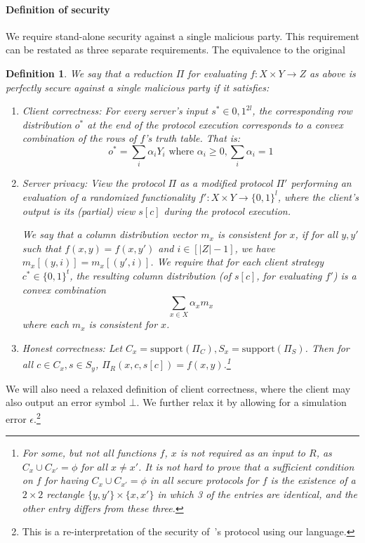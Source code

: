 \documentclass[a4paper]{article}
\newtheorem{definition}{Definition}[section]
\newcommand{\support}{\mathrm{support}}
\begin{document}
\paragraph{Definition of security}
We require stand-alone security against a single malicious party. This requirement can be restated as three separate requirements. The equivalence to the original 
\begin{definition}\label{perfect-security}
We say that a reduction $\Pi$ for evaluating $f:X\times Y\rightarrow Z$ as above is perfectly secure against a single malicious party if it satisfies:
\begin{enumerate}
\item Client correctness: For every server's input $s^*\in {0,1}^{2l}$, the corresponding row distribution $o^*$ at the end
of the protocol execution corresponds to a convex combination of the rows of $f$'s truth table. That is:
\[o^* = \sum_i \alpha_iY_i\text{ where } \alpha_i\geq 0,\sum_i\alpha_i=1\]
\item Server privacy: View the protocol $\Pi$ as a modified protocol $\Pi'$ performing an evaluation of a randomized functionality $f':X\times Y\rightarrow\{0,1\}^l$, where the client's output is its (partial) view $s[c]$ during the protocol execution. 

We say that a column distribution vector $m_x$ is consistent for $x$, if for all $y,y'$ such that $f(x,y)= f(x,y')$ and $i\in [|Z|-1]$, we have $m_x[(y,i)]=m_x[(y',i)]$. 
We require that for each client strategy $c^*\in\{0,1\}^t$, 
the resulting column distribution (of $s[c]$, for evaluating $f'$) is a convex combination
\[\sum_{x\in X} \alpha_xm_x\] where each $m_x$ is consistent for $x$.

\item Honest correctness: Let $C_x=\support(\Pi_C),S_x=\support(\Pi_S)$. Then for all $c\in C_x,s\in S_y$, $\Pi_R(x,c,s[c])=f(x,y)$.\footnote{For some, but not all functions $f$, $x$ is not required as an input to $R$, as $C_x\cup C_{x'}=\phi$ for all $x\neq x'$. It is not hard to prove that a sufficient condition on $f$ for having $C_x\cup C_{x'}=\phi$ in all secure protocols for $f$ is the existence of a $2\times 2$ rectangle $\{y,y'\}\times\{x,x'\}$ in which 3 of the entries are identical, and the other entry differs from these three.} 
\end{enumerate}
\end{definition}

We will also need a relaxed definition of client correctness, where the client may also output an error symbol $\bot$. We further relax it by allowing for a simulation error $\epsilon$.\footnote{This is a re-interpretation of the security of~\cite{IKOPS}'s protocol using our language.}
\end{document}
